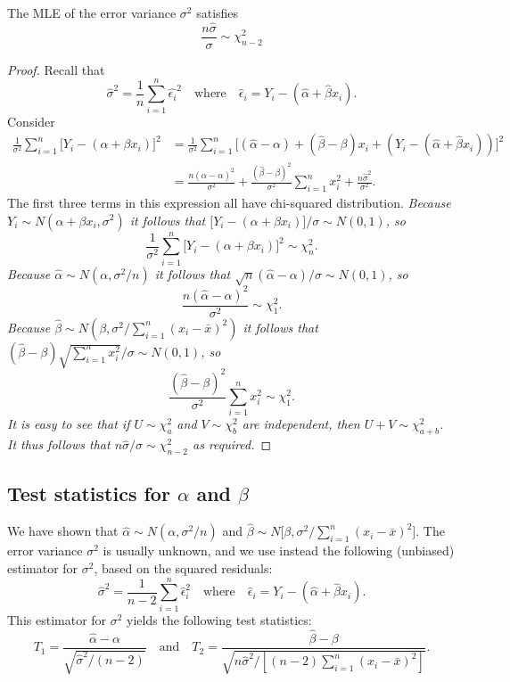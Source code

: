 \begin{lemma}%
The MLE of the error variance $\sigma^2$ satisfies
\[
\frac{n\hat{\sigma}}{\sigma} \sim \chi^2_{n-2}
\]
\end{lemma}
\begin{proof}
Recall that
\[
\hat{\sigma}^2 = \frac{1}{n}\sum_{i=1}^n \hat{\epsilon_i}^2
\quad\text{where}\quad
\hat{\epsilon}_i = Y_i-(\hat{\alpha}+\hat{\beta} x_i).
\]
Consider
\begin{align*}
\frac{1}{\sigma^2}\sum_{i=1}^n\big[Y_i-(\alpha+\beta x_i)\big]^2 
	& = \frac{1}{\sigma^2}\sum_{i=1}^n\big[(\hat{\alpha}-\alpha) + (\hat{\beta}-\beta)x_i + (Y_i-(\hat{\alpha}+\hat{\beta}x_i))\big]^2 \\
	& = \frac{n(\hat{\alpha}-\alpha)^2}{\sigma^2} + \frac{(\hat{\beta}-\beta)^2}{\sigma^2}\sum_{i=1}^n x_i^2 + \frac{n\hat{\sigma}^2}{\sigma^2}.
\end{align*}
The first three terms in this expression all have chi-squared distribution.
\bit
\it
Because $Y_i\sim N(\alpha+\beta x_i,\sigma^2)$ it follows that $\big[Y_i-(\alpha+\beta x_i)\big]/\sigma\sim N(0,1)$, so
\[
\displaystyle\frac{1}{\sigma^2}\sum_{i=1}^n\big[Y_i-(\alpha+\beta x_i)\big]^2\sim\chi^2_{n}.
\]
\it
Because $\hat{\alpha}\sim N(\alpha,\sigma^2/n)$ it follows that $\sqrt{n}(\hat{\alpha}-\alpha)/\sigma\sim N(0,1)$, so
\[
\displaystyle\frac{n(\hat{\alpha}-\alpha)^2}{\sigma^2} \sim \chi^2_1.
\]
\it 
Because $\hat{\beta}\sim N\left(\beta,\sigma^2/\sum_{i=1}^n(x_i-\bar{x})^2\right)$ it follows that $(\hat{\beta}-\beta)\sqrt{\sum_{i=1}^n x_i^2}/\sigma \sim N(0,1)$, so
\[
\frac{(\hat{\beta}-\beta)^2}{\sigma^2}\sum_{i=1}^n x_i^2 \sim \chi^2_1.
\]
\eit
It is easy to see that if $U\sim\chi^2_a$ and $V\sim\chi^2_b$ are independent, then $U+V\sim\chi^2_{a+b}$. It thus follows that $n\hat{\sigma}/\sigma\sim \chi^2_{n-2}$ as required.
\end{proof}

\subsection{Test statistics for $\alpha$ and $\beta$}

We have shown that $\hat{\alpha} \sim N(\alpha,\sigma^2/n)$ and $\hat{\beta}\sim N\Big[\beta,\sigma^2 / \sum_{i=1}^n(x_i-\bar{x})^2\Big]$. The error variance $\sigma^2$ is usually unknown, and we use instead the following (unbiased) estimator for $\sigma^2$, based on the squared residuals:
\[
\hat{\sigma}^2 = \frac{1}{n-2}\sum_{i=1}^n \hat{\epsilon}_i^2 
\quad\text{where}\quad
\hat{\epsilon}_i = Y_i-(\hat{\alpha}+\hat{\beta} x_i).
\]
This estimator for $\sigma^2$ yields the following test statistics:
\[
T_1 = \frac{\hat{\alpha}-\alpha}{\sqrt{\hat{\sigma}^2/(n-2)}}
\quad\text{and}\quad
T_2 = \frac{\hat{\beta}-\beta}{\sqrt{n\hat{\sigma}^2/[(n-2)\sum_{i=1}^n(x_i-\bar{x})^2]}}.
\]

